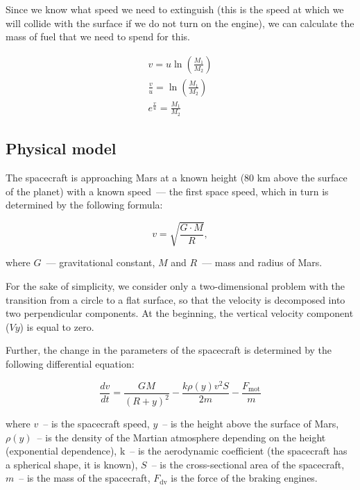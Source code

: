 \documentclass[12pt,a4paper]{article}
\begin{document}
Since we know what speed we need to extinguish (this is the speed at which we will collide with the surface if we do not turn on the engine), we can calculate the mass of fuel that we need to spend for this.

$$
\begin{array}{c}

  v = u \ln\left(\frac{M_1}{M_2}\right) \\
  \frac{v}{u} = \ln\left(\frac{M_1}{M_2}\right) \\
  e^{\frac{v}{u}} = \frac{M_1}{M_2}
\end{array}
$$

\hfill

\noindent{}

\subsection{Physical model}
\label{Sec:Mars-Model}

The spacecraft is approaching Mars at a known height (80 km above the surface of the planet) with a known speed~--- the first space speed, which in turn is determined by the following formula:

$$
v = \sqrt{\frac{G \cdot M}{R}},
$$

where $G$~--- gravitational constant, $M$ and $R$~--- mass and radius of Mars.

For the sake of simplicity, we consider only a two-dimensional problem with the transition from a circle to a flat surface, so that the velocity is decomposed into two perpendicular components. At the beginning, the vertical velocity component ($Vy$) is equal to zero.

Further, the change in the parameters of the spacecraft is determined by the following differential equation:

$$
\frac{dv}{dt} = \frac{G M}{(R + y)^2} - \frac{k \rho(y) v^2 S}{2 m} - \frac{F_{\text{mot}}}{m}
$$

where $v$~-- is the spacecraft speed, $y$~-- is the height above the surface of Mars, $\rho(y)$~-- is the density of the Martian atmosphere depending on the height (exponential dependence), k~-- is the aerodynamic coefficient (the spacecraft has a spherical shape, it is known), $S$~-- is the cross-sectional area of the spacecraft, $m$~-- is the mass of the spacecraft, $F_{\text{dv}}$ is the force of the braking engines.
\end{document}
